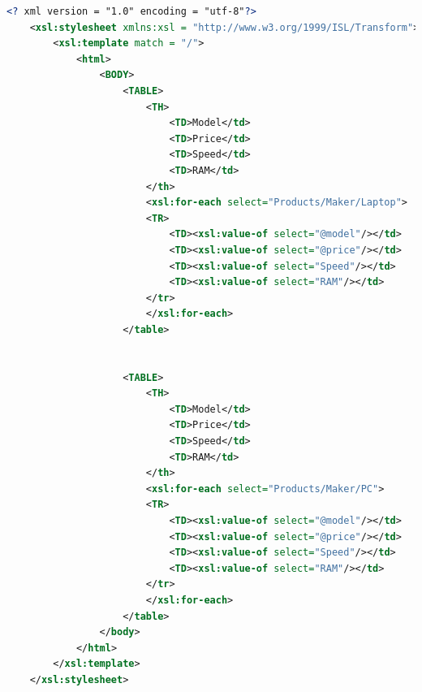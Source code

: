 \documentclass[12pt]{article}
\begin{document}
\begin{enumerate}[1.]
\begin{enumerate}[a)]
    \begin{lstlisting}[language=XML]
    <? xml version = "1.0" encoding = "utf-8"?>
    <xsl:stylesheet xmlns:xsl = "http://www.w3.org/1999/ISL/Transform">
        <xsl:template match = "/">
            <html>
                <BODY>
                    <TABLE>
                        <TH>
                            <TD>Model</td>
                            <TD>Price</td>
                            <TD>Speed</td>
                            <TD>RAM</td>
                        </th>
                        <xsl:for-each select="Products/Maker/Laptop">
                        <TR>
                            <TD><xsl:value-of select="@model"/></td>
                            <TD><xsl:value-of select="@price"/></td>
                            <TD><xsl:value-of select="Speed"/></td>
                            <TD><xsl:value-of select="RAM"/></td>
                        </tr>
                        </xsl:for-each>
                    </table>


                    <TABLE>
                        <TH>
                            <TD>Model</td>
                            <TD>Price</td>
                            <TD>Speed</td>
                            <TD>RAM</td>
                        </th>
                        <xsl:for-each select="Products/Maker/PC">
                        <TR>
                            <TD><xsl:value-of select="@model"/></td>
                            <TD><xsl:value-of select="@price"/></td>
                            <TD><xsl:value-of select="Speed"/></td>
                            <TD><xsl:value-of select="RAM"/></td>
                        </tr>
                        </xsl:for-each>
                    </table>
                </body>
            </html>
        </xsl:template>
    </xsl:stylesheet>
    \end{lstlisting}


    \end{enumerate}
\end{enumerate}
\end{document}
